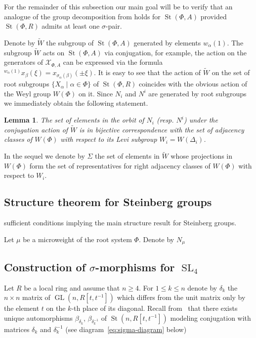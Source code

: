 \documentclass[oneside, 10pt]{amsart}
\DeclareMathOperator{\St}{St}
\DeclareMathOperator{\GL}{GL}
\DeclareMathOperator{\SL}{SL}
\numberwithin{equation}{section}
\newtheorem{lemma}{Lemma}
\numberwithin{lemma}{section}
\theoremstyle{definition}
\theoremstyle{remark}
\begin{document}
For the remainder of this subsection our main goal will be to verify that an analogue of the group decomposition from \cite[Lemma~3.1f]{Tu83} holds for $\St(\Phi, A)$
 provided $\St(\Phi, R)$ admits at least one $\sigma$-pair.

Denote by $\widetilde{W}$ the subgroup of $\St(\Phi, A)$ generated by elements $w_\alpha(1)$.
The subgroup $\widetilde{W}$ acts on $\St(\Phi, A)$ via conjugation, for example, 
 the action on the generators of $\mathcal{X}_{\Phi, A}$ can be expressed via the formula ${}^{w_\alpha(1)} \!x_{\beta}(\xi) = x_{\sigma_{\alpha}(\beta)} ( \pm \xi)$.
It is easy to see that the action of $\widetilde{W}$ on the set of root subgroups $\{X_\alpha \mid \alpha \in \Phi \}$ of $\St(\Phi, R)$ coincides with the obvious
 action of the Weyl group $W(\Phi)$ on it. Since $N_i$ and $N^i$ are generated by root subgroups we immediately obtain the following statement.
\begin{lemma} The set of elements in the orbit of $N_i$ (resp. $N^i$) under the conjugation action of $\widetilde{W}$ 
is in bijective correspondence with 
the set of adjacency classes of $W(\Phi)$ with respect to its Levi subgroup $W_i = W(\Delta_i)$. %
\end{lemma}
In the sequel we denote by $\Sigma$ the set of elements in $\widetilde{W}$ whose projections in $W(\Phi)$ form the set of representatives for
 right adjacency classes of $W(\Phi)$ with respect to $W_i$. %


\subsection{Structure theorem for Steinberg groups}


sufficient conditions implying the main structure result for Steinberg groups.

Let $\mu$ be a microweight of the root system $\Phi$. Denote by $N_\mu$

\subsection{Construction of \texorpdfstring{$\sigma$}{sigma}-morphisms for $\SL_4$}
Let $R$ be a local ring and assume that $n\geq 4$.
For $1\leq k\leq n$ denote by $\delta_k$ the $n\times n$ matrix of $\GL(n, R[t, t^{-1}])$ which differs from the unit matrix 
 only by the element $t$ on the $k$-th place of its diagonal.
Recall from~\cite[Corollary~4]{Ka77} that there exists unique automorphisms $\beta_{\delta_k}$, $\beta_{\delta_k^{-1}}$ of $\St(n, R[t, t^{-1}])$
 modeling conjugation with matrices $\delta_k$ and $\delta_k^{-1}$ (see diagram~\eqref{eq:sigma-diagram} below)
\end{document}
